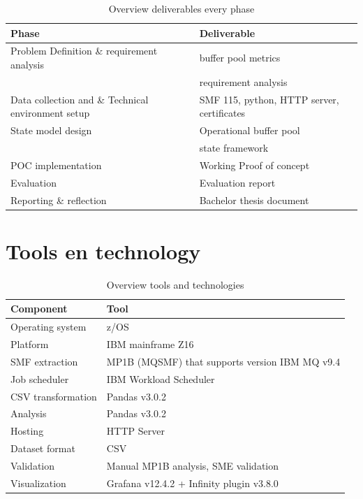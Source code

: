 \begin{table}[h]
    \centering
    \renewcommand{\arraystretch}{1.3}
    \begin{tabular}{|l|l|}
        \hline
        \textbf{Phase} & \textbf{Deliverable} \\
        \hline
        Problem Definition \& requirement analysis        &  buffer pool metrics\\
        &   requirement analysis  \\
        Data collection and \& Technical environment setup  & SMF 115, python, HTTP server, certificates  \\
        State model design       & Operational buffer pool  \\
        & state framework \\
        POC implementation          & Working Proof of concept \\
        Evaluation       & Evaluation report \\
        Reporting \& reflection      & Bachelor thesis document \\
        \hline
    \end{tabular}
    \caption{Overview deliverables every phase}
\end{table}







\section{Tools en technology}


\begin{table}[h]
    \centering
    \renewcommand{\arraystretch}{1.3}
    \begin{tabular}{|l|l|}
        \hline
        \textbf{Component} & \textbf{Tool} \\
        \hline
        Operating system & z/OS \\
        Platform      & IBM mainframe Z16 \\
        SMF extraction      & MP1B (MQSMF) that supports version IBM MQ v9.4 \\
        Job scheduler      & IBM Workload Scheduler  \\
        CSV transformation & Pandas v3.0.2 \\
        Analysis  & Pandas v3.0.2 \\
        Hosting  & HTTP Server \\
        Dataset format       & CSV \\
        Validation          & Manual MP1B analysis, SME validation \\
        Visualization       & Grafana v12.4.2 + Infinity plugin v3.8.0 \\
        \hline
    \end{tabular}
    \caption{Overview tools and technologies}
\end{table}

